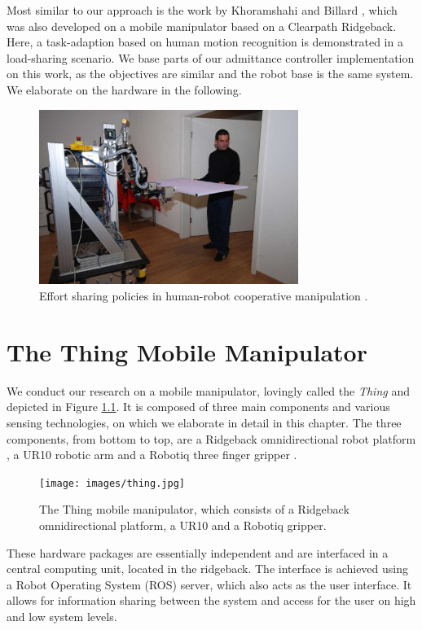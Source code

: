 Most similar to our approach is the work by Khoramshahi and Billard \citep{khoramshahi2018dynamical}, which was also developed on a mobile manipulator based on a Clearpath Ridgeback. Here, a task-adaption based on human motion recognition is demonstrated in a load-sharing scenario. We base parts of our admittance controller implementation on this work, as the objectives are similar and the robot base is the same system. We elaborate on the hardware in the following.

\begin{figure}[h]
   \centering
   \includegraphics[width=0.75\textwidth]{images/lawitzky2010.png}
   \caption{Effort sharing policies in human-robot cooperative manipulation  \citep{lawitzky2010load}.}
   \label{pics:lawitzky2010}
\end{figure}

\chapter{The Thing Mobile Manipulator}
We conduct our research on a mobile manipulator, lovingly called the \emph{Thing} and depicted in Figure \ref{pics:thing}. It is composed of three main components and various sensing technologies, on which we elaborate in detail in this chapter. The three components, from bottom to top, are a Ridgeback omnidirectional robot platform \citep{ridgeback}, a UR10 robotic arm \citep{ur10} and a Robotiq three finger gripper \citep{robotiqGripper}.

\begin{figure}[h]
   \centering
   \texttt{[image: images/thing.jpg]}
   \caption{The Thing mobile manipulator, which consists of a Ridgeback omnidirectional platform, a UR10 and a Robotiq gripper.}
   \label{pics:thing}
\end{figure}

These hardware packages are essentially independent and are interfaced in a central computing unit, located in the ridgeback. The interface is achieved using a Robot Operating System (ROS) server, which also acts as the user interface. It allows for information sharing between the system and access for the user on high and low system levels.

